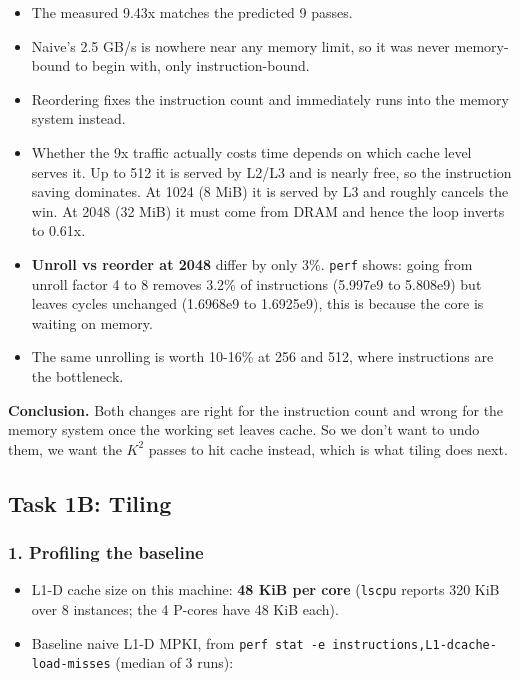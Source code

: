 \documentclass[
  10pt,
]{article}
\providecommand{\tightlist}{%
  \setlength{\itemsep}{0pt}\setlength{\parskip}{0pt}}
\begin{document}
\begin{itemize}
\tightlist
\item
  The measured 9.43x matches the predicted 9 passes.
\item
  Naive's 2.5 GB/s is nowhere near any memory limit, so it was never
  memory-bound to begin with, only instruction-bound.
\item
  Reordering fixes the instruction count and immediately runs into the memory
  system instead.
\item
  Whether the 9x traffic actually costs time depends on which cache level
  serves it. Up to 512 it is served by L2/L3 and is nearly free, so the
  instruction saving dominates. At 1024 (8 MiB) it is served by L3 and roughly
  cancels the win. At 2048 (32 MiB) it must come from DRAM and hence the loop
  inverts to 0.61x.
\item
  \textbf{Unroll vs reorder at 2048} differ by only 3\%. \texttt{perf} shows:
  going from unroll factor 4 to 8 removes 3.2\% of instructions (5.997e9 to
  5.808e9) but leaves cycles unchanged (1.6968e9 to 1.6925e9), this is because
  the core is waiting on memory.
\item
  The same unrolling is worth 10-16\% at 256 and 512, where instructions are
  the bottleneck.
\end{itemize}

\textbf{Conclusion.} Both changes are right for the instruction count and
wrong for the memory system once the working set leaves cache. So we don't
want to undo them, we want the $K^2$ passes to hit cache instead, which is
what tiling does next.

\subsection{Task 1B: Tiling}\label{task-1b-tiling}

\subsubsection{1. Profiling the baseline}\label{profiling-the-baseline}

\begin{itemize}
\tightlist
\item
  L1-D cache size on this machine: \textbf{48 KiB per core}
  (\texttt{lscpu} reports 320 KiB over 8 instances; the 4 P-cores have 48
  KiB each).
\item
  Baseline naive L1-D MPKI, from
  \texttt{perf\ stat\ -e\ instructions,L1-dcache-load-misses} (median of
  3 runs):
\end{itemize}
\end{document}
